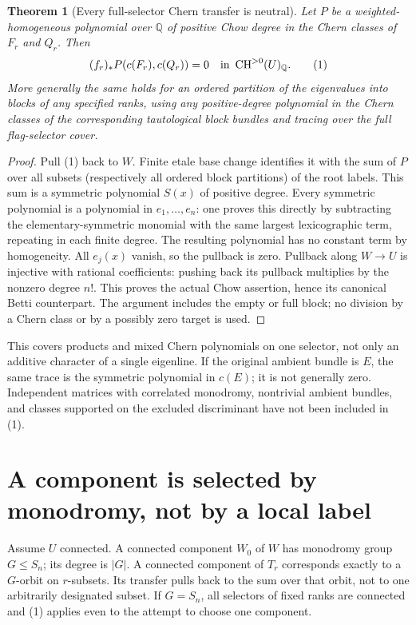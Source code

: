 \documentclass[11pt]{article}
\newtheorem{theorem}{Theorem}
\newcommand{\Q}{\mathbb Q}
\newcommand{\CH}{\operatorname{CH}}
\begin{document}
\begin{theorem}[Every full-selector Chern transfer is neutral]
Let $P$ be a weighted-homogeneous polynomial over $\Q$ of positive
Chow degree in the Chern classes of $F_r$ and $Q_r$. Then
\[
 (f_r)_*P(c(F_r),c(Q_r))=0\quad\hbox{in }\CH^{>0}(U)_\Q.\tag{1}
\]
More generally the same holds for an ordered partition of the eigenvalues
into blocks of any specified ranks, using any positive-degree polynomial
in the Chern classes of the corresponding tautological block bundles and
tracing over the full flag-selector cover.
\end{theorem}
\begin{proof}
Pull (1) back to $W$. Finite etale base change identifies it with the sum
of $P$ over all subsets (respectively all ordered block partitions) of the
root labels. This sum is a symmetric polynomial $S(x)$ of positive degree.
Every symmetric polynomial is a polynomial in $e_1,\ldots,e_n$:
one proves this directly by subtracting the elementary-symmetric monomial
with the same largest lexicographic term, repeating in each finite degree.
The resulting polynomial has no constant term by homogeneity. All $e_j(x)$
vanish, so the pullback is zero. Pullback along $W\to U$ is injective
with rational coefficients: pushing back its pullback multiplies by the
nonzero degree $n!$. This proves the actual Chow assertion, hence its
canonical Betti counterpart. The argument includes the empty or full block;
no division by a Chern class or by a possibly zero target is used.
\end{proof}
This covers products and mixed Chern polynomials on one selector, not only
an additive character of a single eigenline. If the original ambient bundle
is $E$, the same trace is the symmetric polynomial in $c(E)$; it is not
generally zero. Independent matrices with correlated monodromy, nontrivial
ambient bundles, and classes supported on the excluded discriminant have
not been included in (1).

\section{A component is selected by monodromy, not by a local label}
Assume $U$ connected. A connected component $W_0$ of $W$ has monodromy
group $G\leq S_n$; its degree is $|G|$. A connected component of $T_r$
corresponds exactly to a $G$-orbit on $r$-subsets. Its transfer pulls back
to the sum over that orbit, not to one arbitrarily designated subset.
If $G=S_n$, all selectors of fixed ranks are connected and (1) applies
even to the attempt to choose one component.
\end{document}
